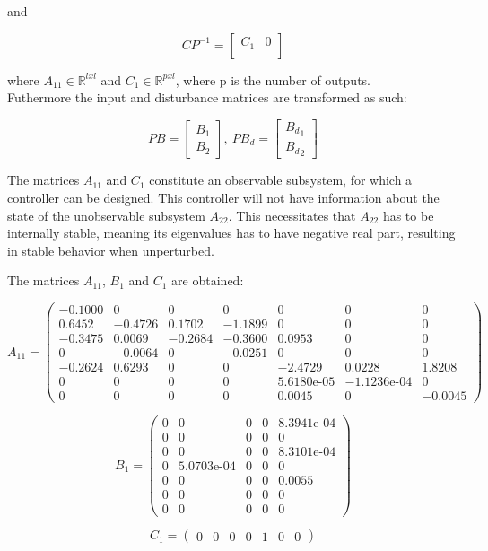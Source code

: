 and

\begin{equation}
	CP^{-1} = \begin{bmatrix}
		C_{1}       & 0 \\
	\end{bmatrix}
\end{equation}

where $A_{11} \in \mathbb{R} ^{l x l}$ and $C_{1} \in \mathbb{R} ^{p x l}$, where p is the number of outputs.\\Futhermore the input and disturbance matrices are transformed as such:

\begin{equation}
	PB = \begin{bmatrix}
		B_1 \\
		B_2
	\end{bmatrix}, \
	PB_d = \begin{bmatrix}
		{B_d}_1 \\
		{B_d}_2
	\end{bmatrix}
\end{equation}


The matrices $A_{11}$ and $C_{1}$ constitute an observable subsystem, for which a controller can be designed. This controller will not have information about the state of the unobservable subsystem $A_{22}$. This necessitates that $A_{22}$ has to be internally stable, meaning its eigenvalues has to have negative real part, resulting in stable behavior when unperturbed.

The matrices $A_{11}$, $B_{1}$ and $C_{1}$ are obtained:

\begin{equation}  \label{eq:A11}
	A_{11} = \left(\begin{array}{ccccccc}
		-0.1000 & 0 & 0 & 0 & 0 & 0 & 0\\
		0.6452 & -0.4726 & 0.1702 & -1.1899 & 0 & 0 & 0\\
		-0.3475 & 0.0069 & -0.2684 & -0.3600 & 0.0953 & 0 & 0\\
		0 & -0.0064 & 0 & -0.0251 & 0 & 0 & 0\\
		-0.2624 & 0.6293 & 0 & 0 & -2.4729 & 0.0228 & 1.8208\\
		0 & 0 & 0 & 0 & \text{5.6180e-05} & -\text{1.1236e-04} & 0\\
		0 & 0 & 0 & 0 & 0.0045 & 0 & -0.0045
	\end{array}\right)
\end{equation}

\begin{equation}  \label{eq:B1}
	B_1 = \left(\begin{array}{ccccc}
		0 & 0 & 0 & 0 & \text{8.3941e-04}\\
		0 & 0 & 0 & 0 & 0\\
		0 & 0 & 0 & 0 & \text{8.3101e-04}\\
		0 & \text{5.0703e-04} & 0 & 0 & 0\\
		0 & 0 & 0 & 0 & 0.0055\\
		0 & 0 & 0 & 0 & 0\\
		0 & 0 & 0 & 0 & 0
	\end{array}\right)
\end{equation}

\begin{equation}  \label{eq:C1}
	C_1 =\left(\begin{array}{ccccccc}
		0 & 0 & 0 & 0 & 1 & 0 & 0
	\end{array}\right)
\end{equation}


